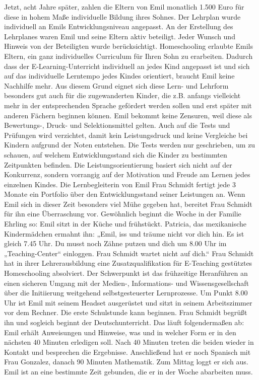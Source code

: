 \documentclass[12pt,a4paper]{article}
\begin{document}
\begin{appendix}
Jetzt, acht Jahre später, zahlen die Eltern von Emil monatlich 1.500 Euro für diese in hohem Maße individuelle Bildung ihres Sohnes. Der Lehrplan wurde individuell an Emils Entwicklungsniveau angepasst. An der Erstellung des Lehrplanes waren Emil und seine Eltern aktiv beteiligt. Jeder Wunsch und Hinweis von der Beteiligten wurde berücksichtigt. Homeschooling erlaubte Emils Eltern, ein ganz individuelles Curriculum für Ihren Sohn zu erarbeiten. Dadurch dass der E-Learning-Unterricht individuell an jedes Kind angepasst ist und sich auf das individuelle Lerntempo jedes Kindes orientiert, braucht Emil keine Nachhilfe mehr. Aus diesem Grund eignet sich diese Lern- und Lehrform besonders gut auch für die zugewanderten Kinder, die z.B. anfangs vielleicht mehr in der entsprechenden Sprache gefördert werden sollen und erst später mit anderen Fächern beginnen können.
Emil bekommt keine Zensuren, weil diese als Bewertungs-, Druck- und Selektionsmittel gelten. Auch auf die Tests und Prüfungen wird verzichtet, damit kein Leistungsdruck und keine Vergleiche bei Kindern aufgrund der Noten entstehen. Die Tests werden nur geschrieben, um zu schauen, auf welchem Entwicklungsstand sich die Kinder zu bestimmten Zeitpunkten befinden. Die Leistungsorientierung basiert sich nicht auf der Konkurrenz, sondern vorrangig auf der Motivation und Freude am Lernen jedes einzelnen Kindes. Die Lernbegleiterin von Emil Frau Schmidt fertigt jede 3 Monate ein Portfolio über den Entwicklungsstand seiner Leistungen an. Wenn Emil sich in dieser Zeit besonders viel Mühe gegeben hat, bereitet Frau Schmidt für ihn eine Überraschung vor.
Gewöhnlich beginnt die Woche in der Familie Ehrling so: Emil sitzt in der Küche und frühstückt. Patricia, das mexikanische Kindermädchen ermahnt ihn: „Emil, iss und träume nicht vor dich hin. Es ist gleich 7.45 Uhr. Du musst noch Zähne putzen und dich um 8.00 Uhr im „Teaching-Center“ einloggen. Frau Schmidt wartet nicht auf dich.“
Frau Schmidt hat in ihrer Lehrerausbildung eine Zusatzqualifikation für E-Teaching gestütztes Homeschooling  absolviert. Der Schwerpunkt ist das frühzeitige Heranführen an einen sicheren Umgang mit der Medien-, Informations- und Wissensgesellschaft über die Initiierung weitgehend selbstgesteuerter Lernprozesse.
Um Punkt 8.00 Uhr ist Emil mit seinem Headset ausgerüstet und sitzt in seinem Arbeitszimmer vor dem Rechner. Die erste Schulstunde kann beginnen. Frau Schmidt begrüßt ihn und sogleich beginnt der Deutschunterricht. Das läuft folgendermaßen ab: Emil erhält Anweisungen und Hinweise, was und in welcher Form er in den nächsten 40 Minuten erledigen soll. Nach 40 Minuten treten die beiden wieder in Kontakt und besprechen die Ergebnisse. Anschließend hat er noch Spanisch mit Frau Gonzalez, danach 90 Minuten Mathematik. Zum Mittag loggt er sich aus. Emil ist an eine bestimmte Zeit gebunden, die er in der Woche abarbeiten muss.

\end{appendix}
\end{document}
